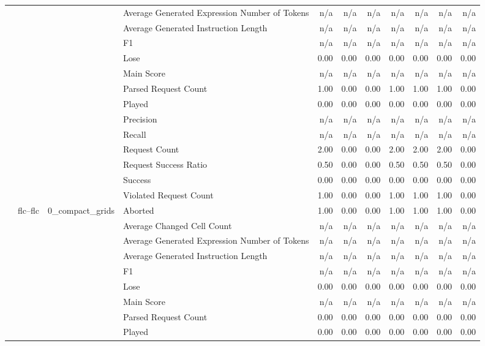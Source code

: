 \begin{tabular}{llllrrrrrrr}
 &  &  & Average Generated Expression Number of Tokens & n/a & n/a & n/a & n/a & n/a & n/a & n/a \\
 &  &  & Average Generated Instruction Length & n/a & n/a & n/a & n/a & n/a & n/a & n/a \\
 &  &  & F1 & n/a & n/a & n/a & n/a & n/a & n/a & n/a \\
 &  &  & Lose & 0.00 & 0.00 & 0.00 & 0.00 & 0.00 & 0.00 & 0.00 \\
 &  &  & Main Score & n/a & n/a & n/a & n/a & n/a & n/a & n/a \\
 &  &  & Parsed Request Count & 1.00 & 0.00 & 0.00 & 1.00 & 1.00 & 1.00 & 0.00 \\
 &  &  & Played & 0.00 & 0.00 & 0.00 & 0.00 & 0.00 & 0.00 & 0.00 \\
 &  &  & Precision & n/a & n/a & n/a & n/a & n/a & n/a & n/a \\
 &  &  & Recall & n/a & n/a & n/a & n/a & n/a & n/a & n/a \\
 &  &  & Request Count & 2.00 & 0.00 & 0.00 & 2.00 & 2.00 & 2.00 & 0.00 \\
 &  &  & Request Success Ratio & 0.50 & 0.00 & 0.00 & 0.50 & 0.50 & 0.50 & 0.00 \\
 &  &  & Success & 0.00 & 0.00 & 0.00 & 0.00 & 0.00 & 0.00 & 0.00 \\
 &  &  & Violated Request Count & 1.00 & 0.00 & 0.00 & 1.00 & 1.00 & 1.00 & 0.00 \\
\cline{2-11} \cline{3-11}
 & \multirow[t]{30}{*}{flc--flc} & \multirow[t]{15}{*}{0_compact_grids} & Aborted & 1.00 & 0.00 & 0.00 & 1.00 & 1.00 & 1.00 & 0.00 \\
 &  &  & Average Changed Cell Count & n/a & n/a & n/a & n/a & n/a & n/a & n/a \\
 &  &  & Average Generated Expression Number of Tokens & n/a & n/a & n/a & n/a & n/a & n/a & n/a \\
 &  &  & Average Generated Instruction Length & n/a & n/a & n/a & n/a & n/a & n/a & n/a \\
 &  &  & F1 & n/a & n/a & n/a & n/a & n/a & n/a & n/a \\
 &  &  & Lose & 0.00 & 0.00 & 0.00 & 0.00 & 0.00 & 0.00 & 0.00 \\
 &  &  & Main Score & n/a & n/a & n/a & n/a & n/a & n/a & n/a \\
 &  &  & Parsed Request Count & 0.00 & 0.00 & 0.00 & 0.00 & 0.00 & 0.00 & 0.00 \\
 &  &  & Played & 0.00 & 0.00 & 0.00 & 0.00 & 0.00 & 0.00 & 0.00 \\

\end{tabular}
